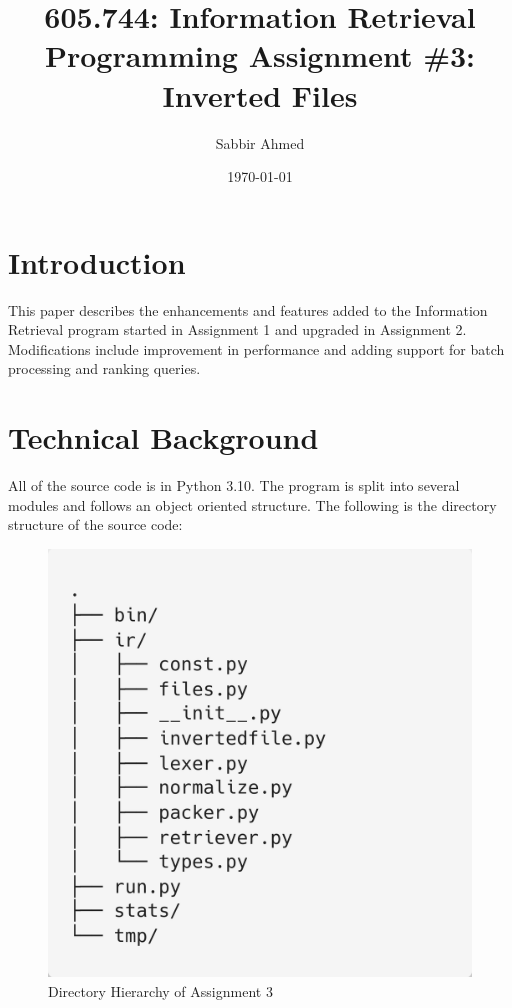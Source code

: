 \documentclass[11pt]{article}
\title{605.744: Information Retrieval \\ Programming Assignment \#3: Inverted Files}
\author{Sabbir Ahmed}
\date{\today}
\begin{document}
\maketitle	

\section{Introduction}
This paper describes the enhancements and features added to the Information Retrieval program started in Assignment 1 and upgraded in Assignment 2. Modifications include improvement in performance and adding support for batch processing and ranking queries.


\section{Technical Background}
All of the source code is in Python 3.10. The program is split into several modules and follows an object oriented structure. The following is the directory structure of the source code:


\begin{figure}[!ht]
    \centering
    \includegraphics[scale=0.2]{statics/dirtree.png}
    \caption{Directory Hierarchy of Assignment 3}
\end{figure}
\end{document}
